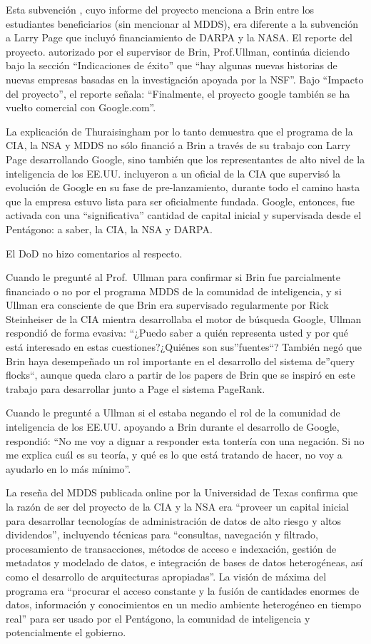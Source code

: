 \documentclass[10pt,a5paper,twoside,spanish,]{book}
\begin{document}
Esta subvención , cuyo informe del proyecto menciona a Brin entre los
estudiantes beneficiarios (sin mencionar al MDDS), era diferente a la
subvención a Larry Page que incluyó financiamiento de DARPA y la NASA.
El reporte del proyecto. autorizado por el supervisor de Brin,
Prof.Ullman, continúa diciendo bajo la sección ``Indicaciones de éxito''
que ``hay algunas nuevas historias de nuevas empresas basadas en la
investigación apoyada por la NSF''. Bajo ``Impacto del proyecto'', el
reporte señala: ``Finalmente, el proyecto google también se ha vuelto
comercial con Google.com''.

La explicación de Thuraisingham por lo tanto demuestra que el programa
de la CIA, la NSA y MDDS no sólo financió a Brin a través de su trabajo
con Larry Page desarrollando Google, sino también que los representantes
de alto nivel de la inteligencia de los EE.UU. incluyeron a un oficial
de la CIA que supervisó la evolución de Google en su fase de
pre-lanzamiento, durante todo el camino hasta que la empresa estuvo
lista para ser oficialmente fundada. Google, entonces, fue activada con
una ``significativa'' cantidad de capital inicial y supervisada desde el
Pentágono: a saber, la CIA, la NSA y DARPA.

El DoD no hizo comentarios al respecto.

Cuando le pregunté al Prof.~Ullman para confirmar si Brin fue
parcialmente financiado o no por el programa MDDS de la comunidad de
inteligencia, y si Ullman era consciente de que Brin era supervisado
regularmente por Rick Steinheiser de la CIA mientra desarrollaba el
motor de búsqueda Google, Ullman respondió de forma evasiva: ``¿Puedo
saber a quién representa usted y por qué está interesado en estas
cuestiones?¿Quiénes son sus''fuentes``? También negó que Brin haya
desempeñado un rol importante en el desarrollo del sistema de''query
flocks``, aunque queda claro a partir de los papers de Brin que se
inspiró en este trabajo para desarrollar junto a Page el sistema
PageRank.

Cuando le pregunté a Ullman si el estaba negando el rol de la comunidad
de inteligencia de los EE.UU. apoyando a Brin durante el desarrollo de
Google, respondió: ``No me voy a dignar a responder esta tontería con
una negación. Si no me explica cuál es su teoría, y qué es lo que está
tratando de hacer, no voy a ayudarlo en lo más mínimo''.

La reseña del MDDS publicada online por la Universidad de Texas confirma
que la razón de ser del proyecto de la CIA y la NSA era ``proveer un
capital inicial para desarrollar tecnologías de administración de datos
de alto riesgo y altos dividendos'', incluyendo técnicas para
``consultas, navegación y filtrado, procesamiento de transacciones,
métodos de acceso e indexación, gestión de metadatos y modelado de
datos, e integración de bases de datos heterogéneas, así como el
desarrollo de arquitecturas apropiadas''. La visión de máxima del
programa era ``procurar el acceso constante y la fusión de cantidades
enormes de datos, información y conocimientos en un medio ambiente
heterogéneo en tiempo real'' para ser usado por el Pentágono, la
comunidad de inteligencia y potencialmente el gobierno.
\end{document}
